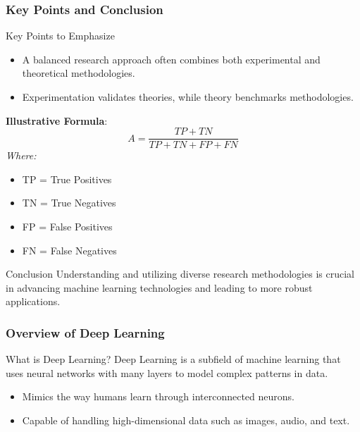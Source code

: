 \documentclass[aspectratio=169]{beamer}
\begin{document}
\begin{frame}[fragile]
    \frametitle{Key Points and Conclusion}

    \begin{block}{Key Points to Emphasize}
        \begin{itemize}
            \item A balanced research approach often combines both experimental and theoretical methodologies.
            \item Experimentation validates theories, while theory benchmarks methodologies.
        \end{itemize}
    \end{block}

    \textbf{Illustrative Formula}:
    \begin{equation}
    A = \frac{TP + TN}{TP + TN + FP + FN}
    \end{equation}
    \textit{Where:} 
    \begin{itemize}
        \item TP = True Positives
        \item TN = True Negatives
        \item FP = False Positives
        \item FN = False Negatives
    \end{itemize}

    \begin{block}{Conclusion}
        Understanding and utilizing diverse research methodologies is crucial in advancing machine learning technologies and leading to more robust applications.
    \end{block}
    
\end{frame}

\begin{frame}[fragile]
    \frametitle{Overview of Deep Learning}
    \begin{block}{What is Deep Learning?}
        Deep Learning is a subfield of machine learning that uses neural networks with many layers to model complex patterns in data. 
    \end{block}
    \begin{itemize}
        \item Mimics the way humans learn through interconnected neurons.
        \item Capable of handling high-dimensional data such as images, audio, and text.
    \end{itemize}
\end{frame}
\end{document}

